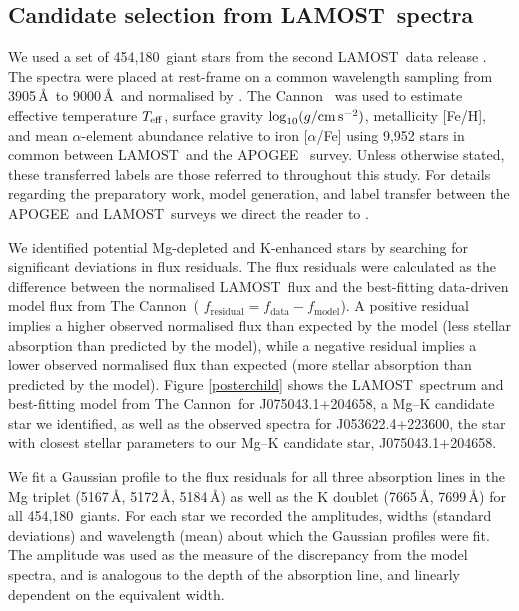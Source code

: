 \documentclass[a4paper,fleqn,usenatbib]{mnras}
\newcommand{\LamostGiants}{454,180}
\newcommand{\project}[1]{#1}
\newcommand{\lamost}{\project{LAMOST}}
\newcommand{\apogee}{\project{APOGEE}}
\newcommand{\tc}{\project{The Cannon}}
\newcommand{\teff}{T_{\rm eff}}
\newcommand{\logg}{\log_{10}(g/{\rm cm\,s}^{-2})}
\begin{document}
\subsection{Candidate selection from \lamost\ spectra}
We used a set of \LamostGiants\ giant stars from the second \lamost\ data release \citep{luo2016vizier}. The spectra were placed at rest-frame on a common wavelength sampling from 3905\,\AA\ to 9000\,\AA\ and normalised by \citet{ho2017}. \tc\ \citep{ness2016,ho2017} was used to estimate effective temperature $\teff$, surface gravity $\logg$, metallicity [Fe/H], and mean $\alpha$-element abundance relative to iron [$\alpha$/Fe] using 9,952 stars in common between \lamost\ and the \apogee\ \citep{alam2015} survey. Unless otherwise stated, these transferred labels are those referred to throughout this study. For details regarding the preparatory work, model generation, and label transfer between the \apogee\ and \lamost\ surveys we direct the reader to \citet{ho2017}. 

We identified potential Mg-depleted and K-enhanced stars by searching for significant deviations in flux residuals. The flux residuals were calculated as the difference between the normalised \lamost\ flux and the best-fitting data-driven model flux from \tc\ ( $f_{\textrm{residual}} = f_{\textrm{data}} - f_{\textrm{model}}$). A positive residual implies a higher observed normalised flux than expected by the model (less stellar absorption than predicted by the model), while a negative residual implies a lower observed normalised flux than expected (more stellar absorption than predicted by the model). Figure \ref{posterchild} shows the \lamost\ spectrum and best-fitting model from \tc\ for J075043.1+204658, a Mg--K candidate star we identified, as well as the observed spectra for J053622.4+223600, the star with closest stellar parameters to our Mg--K candidate star, J075043.1+204658. 

We fit a Gaussian profile to the flux residuals for all three absorption lines in the Mg triplet (5167\,\AA, 5172\,\AA, 5184\,\AA) as well as the K doublet (7665\,\AA, 7699\,\AA) for all \LamostGiants\ giants. For each star we recorded the amplitudes, widths (standard deviations) and wavelength (mean) about which the Gaussian profiles were fit. The amplitude was used as the measure of the discrepancy from the model spectra, and is analogous to the depth of the absorption line, and linearly dependent on the equivalent width. %
\end{document}
